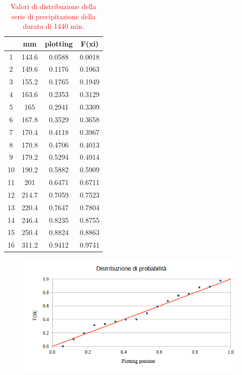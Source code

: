 \begin{table}[H] \centering
    \caption{\textcolor{red}{Valori di distribuzione della serie di precipitazione della durata di 1440 min.}}
            \begin{tabular}{cccc}
            \toprule
               & mm    & plotting & F(xi)  \\
            \midrule
            1  & 143.6 & 0.0588   & 0.0018 \\
            2  & 149.6 & 0.1176   & 0.1063 \\
            3  & 155.2 & 0.1765   & 0.1949 \\
            4  & 163.6 & 0.2353   & 0.3129 \\
            5  & 165   & 0.2941   & 0.3309 \\
            6  & 167.8 & 0.3529   & 0.3658 \\
            7  & 170.4 & 0.4118   & 0.3967 \\
            8  & 170.8 & 0.4706   & 0.4013 \\
            9  & 179.2 & 0.5294   & 0.4914 \\
            10 & 190.2 & 0.5882   & 0.5909 \\
            11 & 201   & 0.6471   & 0.6711 \\
            12 & 214.7 & 0.7059   & 0.7523 \\
            13 & 220.4 & 0.7647   & 0.7804 \\
            14 & 246.4 & 0.8235   & 0.8755 \\
            15 & 250.4 & 0.8824   & 0.8863 \\
            16 & 311.2 & 0.9412   & 0.9741 \\
            \bottomrule
            \end{tabular}
\end{table}

\begin{figure}[H]\centering
    \includegraphics[scale=0.75]{immagini/distr_prob_1440min.png}
\end{figure}

